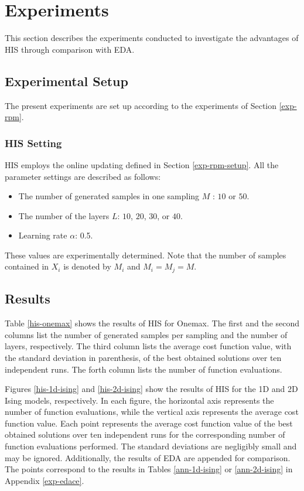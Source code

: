 \section{Experiments}
This section describes the experiments conducted to investigate
the advantages of HIS 
through comparison with EDA.


\subsection{Experimental Setup}
The present experiments are set up according to the experiments of
Section \ref{exp-rpm}.

\subsubsection{HIS Setting}
HIS employs the online updating defined in Section \ref{exp-rpm-setup}.
All the parameter settings are described as follows:
\begin{itemize}
 \item The number of generated samples in one sampling $M$ : $10$ or $50$.
 \item The number of the layers $L$: $10$, $20$, $30$, or $40$.
 \item Learning rate $\alpha$: 0.5.
\end{itemize}
These values are experimentally determined.
Note that the number of samples contained in $X_i$
is denoted by $M_i$ and $M_i=M_j=M$.


\subsection{Results}





Table \ref{his-onemax} shows the results of HIS for Onemax.
The first and the second columns list the number of generated samples
per sampling and the number of layers, respectively.
The third column lists the average cost function value,
 with the standard deviation
in parenthesis, of the best obtained solutions over ten independent runs.
The forth column lists the number of function evaluations.

Figures \ref{his-1d-ising} and \ref{his-2d-ising} show
the results of HIS for the 1D and 2D Ising models, respectively.
In each figure,
the horizontal axis represents the number of function evaluations,
while the vertical axis represents the average cost function value.
Each point represents the average cost function value of the best obtained
solutions over ten independent runs
for the corresponding number of function evaluations performed.
The standard deviations are negligibly small and may be ignored.
Additionally, the results of EDA are appended for comparison.
The points correspond to the results in
Tables \ref{ann-1d-ising} or \ref{ann-2d-ising}
in Appendix \ref{exp-edace}.

